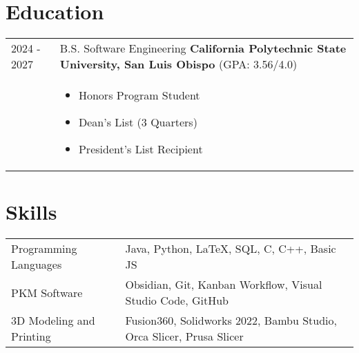 \documentclass[a4paper,12pt]{article}
\begin{document}
\section{Education}
\begin{tabularx}{\linewidth}{@{}l X@{}}	
2024 - 2027 & B.S. Software Engineering \textbf{California Polytechnic State University, San Luis Obispo} \hfill (GPA: 3.56/4.0) \\
& \begin{itemize}[leftmargin=*, nosep]
    \item Honors Program Student 
    \item Dean's List (3 Quarters) 
    \item President's List Recipient
  \end{itemize}
\end{tabularx}

\section{Skills}
\begin{tabularx}{\linewidth}{@{}l X@{}}
Programming Languages &  \normalsize{Java, Python, LaTeX, SQL, C, C++, Basic JS}\\
PKM Software  &  \normalsize{Obsidian, Git, Kanban Workflow, Visual Studio Code, GitHub}\\  
3D Modeling and Printing  &  \normalsize{Fusion360, Solidworks 2022, Bambu Studio, Orca Slicer, Prusa Slicer}\\
\end{tabularx}

\vfill
{}
\end{document}
